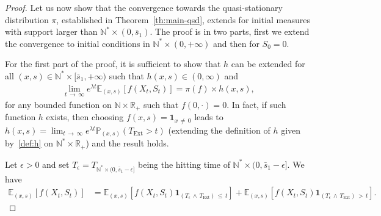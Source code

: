 \documentclass[10pt]{amsart}
\theoremstyle{definition}\newtheorem{defi}[theo]{Definition}\newtheorem{rema}[theo]{Remark}\newtheorem{exam}[theo]{Example}\newtheorem{exem}[theo]{Example}\newtheorem{nota}[theo]{Notation}
\newcommand{\PP}{\mathbb{P}}
\newcommand{\RR}{\mathbb{R}}
\newcommand{\NN}{\mathbb{N}}
\newcommand{\EE}{\mathbb{E}}
\newcommand{\X}{\NN^* \times (0,\bar s_1)}
\newcommand{\Text}{T_{\mathrm{Ext}}}
\newcommand{\1}{\mathbf{1}}
\begin{document}
\begin{proof}
Let us now show that the convergence towards the quasi-stationary distribution $\pi$, established in Theorem~\ref{th:main-qsd}, extends for initial measures with support larger than $\X$. The proof is in two parts, first we extend the convergence to initial conditions in $\NN^*\times (0,+\infty)$ and then for $S_0=0$.

For the first part of the proof, it is sufficient to show that $h$ can be extended for all $(x,s) \in \NN^* \times [\bar s_1,+\infty)$ such that $h(x,s)\in (0,\infty)$ and
\begin{align}\label{eq:cv.exp.lamt.exp}
\lim_{t\,\to\,\infty} e^{\lambda t} \EE_{(x,s)} [f(X_t,S_t)] = \pi(f) \times h(x,s),
\end{align}
for any bounded function on $\NN \times \RR_+$ such that $f(0,\cdot) =0$. In fact, if such function $h$ exists, then choosing $f(x,s)=\1_{x\,\neq\,0}$ leads to $h(x,s)= \lim_{t\,\to\,\infty} e^{\lambda t}\PP_{(x,s)} (\Text>t)$ (extending the definition of $h$ given by~\eqref{def:h} on $\NN^* \times \RR_+$) and the result holds.

Let $\epsilon>0$ and set $T_\epsilon=T_{ \NN^*\times (0,\bar s_1-\epsilon]}$ being the hitting time of $\NN^*\times (0,\bar s_1-\epsilon]$. We have
\begin{align*}
\EE_{(x,s)} \left[f(X_t,S_t)\right] &= \EE_{(x,s)} \left[f(X_t,S_t)\1_{\left(T_\epsilon\,\wedge\,\Text\right)\,\leq\,t}\right] + \EE_{(x,s)} \left[f(X_t,S_t)\1_{\left(T_\epsilon\,\wedge \,\Text\right)\,>\,t}\right].
\end{align*}


\end{proof}
\end{document}
